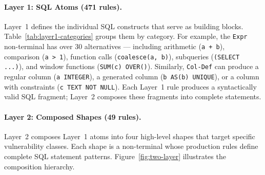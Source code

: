 \paragraph{Layer 1: SQL Atoms (471 rules).}
Layer~1 defines the individual SQL constructs that serve as building blocks. Table~\ref{tab:layer1-categories} groups them by category. For example, the \texttt{Expr} non-terminal has over 30 alternatives --- including arithmetic (\texttt{a + b}), comparison (\texttt{a > 1}), function calls (\texttt{coalesce(a, b)}), subqueries (\texttt{(SELECT ...)}), and window functions (\texttt{SUM(c) OVER()}). Similarly, \texttt{Col-Def} can produce a regular column (\texttt{a INTEGER}), a generated column (\texttt{b AS(b) UNIQUE}), or a column with constraints (\texttt{c TEXT NOT NULL}). Each Layer~1 rule produces a syntactically valid SQL fragment; Layer~2 composes these fragments into complete statements.

\begin{table}[htbp]
\caption{Layer~1 non-terminal categories.}
\label{tab:layer1-categories}
\centering
\small
{}
\end{table}

\paragraph{Layer 2: Composed Shapes (49 rules).}
Layer~2 composes Layer~1 atoms into four high-level shapes that target specific vulnerability classes. Each shape is a non-terminal whose production rules define complete SQL statement patterns. Figure~\ref{fig:two-layer} illustrates the composition hierarchy.

